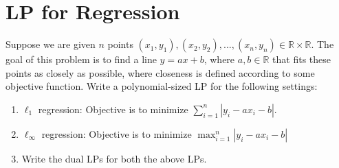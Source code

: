 \documentclass[10pt,letterpaper]{article}
\begin{document}
\section{LP for Regression}
Suppose we are given $n$ points $(x_1, y_1),(x_2, y_2),...,(x_n, y_n) \in \mathbb{R}\times \mathbb{R}$. The goal of this problem is to find a line $y = ax + b$, where $a,b \in\mathbb{R}$   that fits these points as closely as possible, where closeness is defined according to some objective function.
Write a polynomial-sized LP for the following settings:
\begin{enumerate}
    \item $\ell_1$ regression: Objective is to minimize $ \sum_{i=1}^n |y_i - a x_i -b|$.
    
  
    
    \item $\ell_\infty$ regression: Objective is to  minimize  $ \max_{i=1}^n |y_i - a x_i -b|$

 

    \item Write the dual LPs for both the above LPs.
\end{enumerate}





\end{document}

